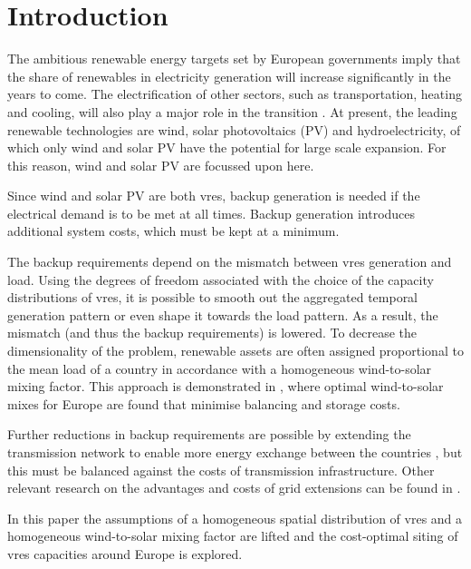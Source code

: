 \documentclass[a4paper, 5p, sort&compress]{elsarticle}%
\begin{document}
\section{Introduction}
\label{sec:one}

The ambitious renewable energy targets set by European governments
\cite{eu2050} imply that the share of renewables in electricity
generation will increase significantly in the years to come.  The
electrification of other sectors, such as transportation, heating and
cooling, will also play a major role in the transition
\cite{Williams12,ecf2050}. At present, the leading renewable
technologies are wind, solar photovoltaics (PV) and hydroelectricity,
of which only wind and solar PV have the potential for large scale
expansion. For this reason, wind and solar PV
are focussed upon here.

Since wind and solar PV are both \gls{vres}, backup generation is needed if the electrical demand is to be met at all times. Backup
generation introduces additional system costs, which must be kept at a minimum.

The backup requirements depend on the mismatch between \gls{vres} generation and load. Using
the degrees of freedom associated with the choice of the capacity distributions of \gls{vres}, it is
possible to smooth out the aggregated temporal generation pattern or even shape it towards the
load pattern. As a result, the mismatch (and thus the backup requirements) is lowered.  To
decrease the dimensionality of the problem, renewable assets are often assigned proportional to
the mean load of a country in accordance with a homogeneous wind-to-solar mixing factor. This
approach is demonstrated in \cite{Heide2010,Heide2011}, where optimal wind-to-solar mixes for
Europe are found that minimise balancing and storage costs.

Further reductions in backup requirements are possible by extending
the transmission network to enable more energy exchange between the
countries \cite{rolando2014,sarah}, but this must be balanced against the costs of transmission infrastructure. Other relevant research on the
advantages and costs of grid extensions can be found in
\cite{Papae,Schaber,Schaber2,Egerer,Brown}.


In this paper the assumptions of a homogeneous spatial distribution of
\gls{vres} and a homogeneous wind-to-solar mixing factor are lifted and the
cost-optimal siting of \gls{vres} capacities around Europe is explored.
\end{document}
